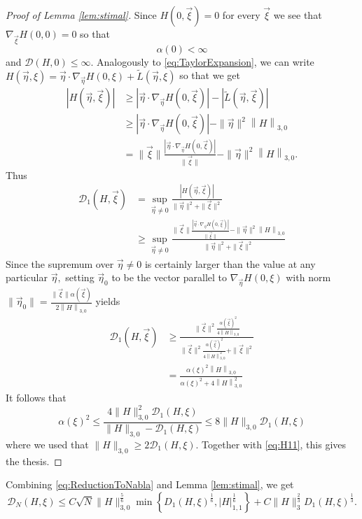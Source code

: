 \documentclass{article}
\newcommand\calD{{\mathcal D}}
\newcommand*\norm[1]{ \left\| #1 \right\| }
\newcommand\set[1]{\left\{ #1 \right\}}
\newcommand\vxi{{\vec \xi}}
\newcommand\veta{{\vec \eta}}
\begin{document}
\begin{proof}[Proof of Lemma \ref{lem:stimal}]
Since $H(0,\vxi)=0$ for every $\vxi$ we see that $\nabla_{\vxi}H(0,0)=0$ so that 
\begin{equation}\label{eq:H11}
\alpha(0)<\infty
\end{equation}
and $\calD(H,0)\leq\infty$. Analogously to  \eqref{eq:TaylorExpansion}, we can write $H(\vec \eta,\xi)
=  \vec \eta \cdot \nabla_{\vec \eta} H(0,\xi) +  \widetilde L(\vec \eta,\xi)$ so that we get
\begin{align*}
|H(\vec \eta,\vxi)| &\geq |\vec \eta \cdot \nabla_{\vec \eta} H(0,\vxi)| - |\widetilde L(\vec \eta,\vxi)|\\
&\geq |\vec \eta \cdot \nabla_{\vec \eta} H(0,\vxi)| - \|\vec \eta\|^2\norm{H}_{3,0}\\
&= \|\vxi\| \frac{|\vec \eta \cdot \nabla_{\vec \eta} H(0,\vxi)|}{\|\vxi\|} - \|\vec \eta\|^2\norm{H}_{3,0}.
\end{align*}
Thus
\begin{align*}
\mathcal D_1(H,\vxi) &= \sup_{\vec \eta \ne 0}\frac{|H(\vec \eta,\vxi)|}{\|\vec \eta\|^2 +\|\vxi\|^2}\\ &\geq \sup_{\vec
\eta\ne 0}\frac{\|\vxi\| \frac{|\vec \eta \cdot \nabla_{\vec \eta} H(0,\vxi)|}{\|\vxi\|} - \|\vec 
\eta\|^2\norm{H}_{3,0}}{\|\veta\|^2 + \|\vxi\|^2}
\end{align*}
Since the supremum over $\vec \eta\ne0$ is certainly larger than the value at any particular $\vec \eta,$ setting $\vec 
\eta_0$ to be the vector parallel to $\nabla_{\vec\eta} H(0,\xi)$ with norm $\|\vec \eta_0\| = 
\frac{\|\vxi\|\alpha(\vxi)}{2\norm{H}_{3,0}}$ yields
\begin{align*}
\mathcal D_1(H,\vxi) &\geq \frac{\|\vxi\|^2
\frac{\alpha(\vxi)^2}{4\norm{H}_{3,0}}}{\|\vxi\|^2\frac{\alpha(\vxi)^2}{4\norm{H}_{3,0}^2} + \|\vxi\|^2}\\ &=
\frac{\alpha(\xi)^2\norm{H}_{3,0}}{\alpha(\xi)^2 + 4\norm{H}_{3,0}^2}
\end{align*}
It follows that
\[
\alpha(\xi)^2 \leq
\frac{4\|H\|_{3,0}^2\calD_1(H,\xi)}{\|H\|_{3,0}-\calD_1(H,\xi)}\leq
8\|H\|_{3,0}\calD_1(H,\xi)
\]
where we used that $\|H\|_{3,0}\geq 2\calD_1(H,\xi)$.	Together with
\eqref{eq:H11}, this gives the thesis.

\end{proof}

Combining \eqref{eq:ReductionToNabla} and Lemma \ref{lem:stimal}, we get
\[
\mathcal D_N(H,\xi) \leq
C\sqrt{N}
\|H\|_{3,0}^{\frac56}\min\set{D_1(H,\xi)^{\frac16},|H|_{1,1}^{\frac16}} +
C\|H\|_3^{\frac23} 
D_1(H,\xi)^{\frac13} .
\]
\end{document}
